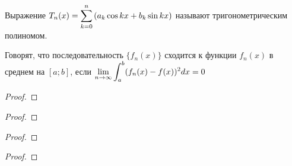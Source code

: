 \begin{definition}
    Выражение $T_n(x) = \displaystyle\sum_{k = 0}^n \left( a_k \cos kx + b_k \sin kx \right)$
    называют тригонометрическим полиномом.
\end{definition}

\begin{definition}
    Говорят, что последовательность $\{ f_n(x) \}$ сходится к функции $f_n(x)$
    в среднем на $[a; b]$, если $\displaystyle\lim_{n \to \infty} \displaystyle\int_a^b (f_n(x) - f(x))^2 dx = 0$
\end{definition}


\begin{theorem}
    
\end{theorem}
\begin{proof}
    
\end{proof}


\begin{theorem}
    
\end{theorem}
\begin{proof}
    
\end{proof}


\begin{theorem}
    
\end{theorem}
\begin{proof}
    
\end{proof}

\begin{corollary}
    
\end{corollary}
\begin{proof}
    
\end{proof}
